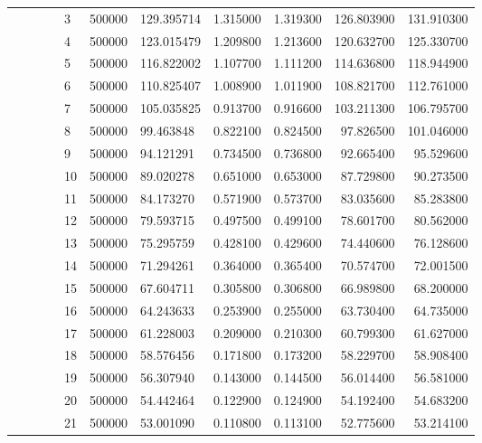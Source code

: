 \begin{tabular}{lllllllrrrr}
\cline{5-11}
 &  &  &  & 3 & 500000 & 129.395714 & 1.315000 & 1.319300 & 126.803900 & 131.910300 \\
\cline{5-11}
 &  &  &  & 4 & 500000 & 123.015479 & 1.209800 & 1.213600 & 120.632700 & 125.330700 \\
\cline{5-11}
 &  &  &  & 5 & 500000 & 116.822002 & 1.107700 & 1.111200 & 114.636800 & 118.944900 \\
\cline{5-11}
 &  &  &  & 6 & 500000 & 110.825407 & 1.008900 & 1.011900 & 108.821700 & 112.761000 \\
\cline{5-11}
 &  &  &  & 7 & 500000 & 105.035825 & 0.913700 & 0.916600 & 103.211300 & 106.795700 \\
\cline{5-11}
 &  &  &  & 8 & 500000 & 99.463848 & 0.822100 & 0.824500 & 97.826500 & 101.046000 \\
\cline{5-11}
 &  &  &  & 9 & 500000 & 94.121291 & 0.734500 & 0.736800 & 92.665400 & 95.529600 \\
\cline{5-11}
 &  &  &  & 10 & 500000 & 89.020278 & 0.651000 & 0.653000 & 87.729800 & 90.273500 \\
\cline{5-11}
 &  &  &  & 11 & 500000 & 84.173270 & 0.571900 & 0.573700 & 83.035600 & 85.283800 \\
\cline{5-11}
 &  &  &  & 12 & 500000 & 79.593715 & 0.497500 & 0.499100 & 78.601700 & 80.562000 \\
\cline{5-11}
 &  &  &  & 13 & 500000 & 75.295759 & 0.428100 & 0.429600 & 74.440600 & 76.128600 \\
\cline{5-11}
 &  &  &  & 14 & 500000 & 71.294261 & 0.364000 & 0.365400 & 70.574700 & 72.001500 \\
\cline{5-11}
 &  &  &  & 15 & 500000 & 67.604711 & 0.305800 & 0.306800 & 66.989800 & 68.200000 \\
\cline{5-11}
 &  &  &  & 16 & 500000 & 64.243633 & 0.253900 & 0.255000 & 63.730400 & 64.735000 \\
\cline{5-11}
 &  &  &  & 17 & 500000 & 61.228003 & 0.209000 & 0.210300 & 60.799300 & 61.627000 \\
\cline{5-11}
 &  &  &  & 18 & 500000 & 58.576456 & 0.171800 & 0.173200 & 58.229700 & 58.908400 \\
\cline{5-11}
 &  &  &  & 19 & 500000 & 56.307940 & 0.143000 & 0.144500 & 56.014400 & 56.581000 \\
\cline{5-11}
 &  &  &  & 20 & 500000 & 54.442464 & 0.122900 & 0.124900 & 54.192400 & 54.683200 \\
\cline{5-11}
 &  &  &  & 21 & 500000 & 53.001090 & 0.110800 & 0.113100 & 52.775600 & 53.214100 \\

\end{tabular}
